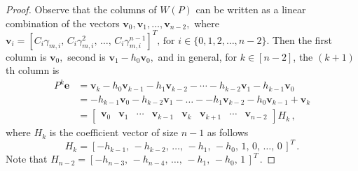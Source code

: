 \documentclass[11pt,oneside]{article}
\theoremstyle{plain}
\theoremstyle{plain}
\theoremstyle{definition}
\numberwithin{figure}{section}
\theoremstyle{remark}
\numberwithin{equation}{section}
\begin{document}
\begin{proof}
		Observe that the columns of $W(P)$ can be written as a linear combination of the vectors $\mathbf{v}_0, \mathbf{v}_1,\dots, \mathbf{v}_{n-2},$ where  
		$\mathbf{v}_i = [C_i\gamma_{m,i},\, C_i\gamma_{m,i}^2,\, \dots,\, C_i\gamma_{m,i}^{n-1}]^T, \, \text{for } i \in \{0, 1, 2, \dots, n-2\}.$  Then the first column is $\mathbf{v}_0,$ second is $\mathbf{v}_1 - h_0\mathbf{v}_0,$ and in general, for $k \in [n-2]$, the $(k+ 1)$th column is 
		\begin{align*}
			P^k\mathbf{e} &= \mathbf{v}_k - h_0 \mathbf{v}_{k-1} - h_1 \mathbf{v}_{k-2} - \cdots - h_{k-2} \mathbf{v}_1 - h_{k-1} \mathbf{v}_0\\
			&= - h_{k-1} \mathbf{v}_0 - h_{k-2} \mathbf{v}_1 -\dots- - h_1 \mathbf{v}_{k-2} - h_0 \mathbf{v}_{k-1}+\mathbf{v}_k \\
			& =\begin{bmatrix}
				\mathbf{v}_0 & \mathbf{v}_1 & \cdots &  \mathbf{v}_{k-1} & \mathbf{v}_k & \mathbf{v}_{k+1}&\cdots& \mathbf{v}_{n-2} 
			\end{bmatrix}H_k\,,
		\end{align*}
		\noindent
		where $H_k$ is the coefficient vector of size $n-1$ as follows
		\[
		H_k = [-h_{k-1},\, -h_{k-2},\, \dots,\, -h_1,\, -h_0,\, 1,\, 0,\, \dots,\, 0\,]^T\,.
		\]
		Note that $H_{n-2} = [-h_{n-3},\, -h_{n-4},\, \dots,\, -h_1,\, -h_0,\, 1\,]^T\,.
		$
		
			

\end{proof}
\end{document}
